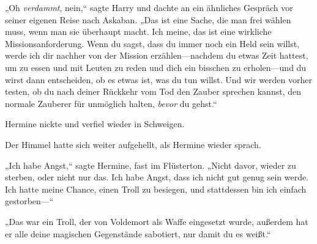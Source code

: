 „Oh \emph{verdammt}, nein,“ sagte Harry und dachte an ein ähnliches Gespräch vor seiner eigenen Reise nach Askaban.
„Das ist eine Sache, die man frei wählen muss, wenn man sie überhaupt macht. Ich meine, das ist eine wirkliche Missionsanforderung. Wenn du sagst, dass du immer noch ein Held sein willst, werde ich dir nachher von der Mission erzählen—nachdem du etwas Zeit hattest, um zu essen und mit Leuten zu reden und dich ein bisschen zu erholen—und du wirst dann entscheiden, ob es etwas ist, was du tun willst. Und wir werden vorher testen, ob du nach deiner Rückkehr vom Tod den Zauber sprechen kannst, den normale Zauberer für unmöglich halten, \emph{bevor} du gehst.“

Hermine nickte und verfiel wieder in Schweigen.

Der Himmel hatte sich weiter aufgehellt, als Hermine wieder sprach.

„Ich habe Angst,“ sagte Hermine, fast im Flüsterton. „Nicht davor, wieder zu sterben, oder nicht nur das. Ich habe Angst, dass ich nicht gut genug sein werde. Ich hatte meine Chance, einen Troll zu besiegen, und stattdessen bin ich einfach gestorben—“

„Das war ein Troll, der von Voldemort als Waffe eingesetzt wurde, außerdem hat er alle deine magischen Gegenstände sabotiert, nur damit du es weißt.“

